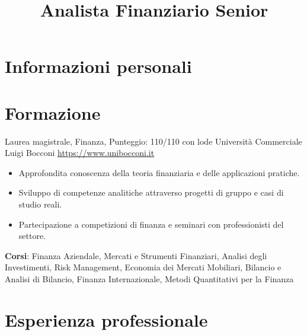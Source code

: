 \documentclass[a4paper, serif, 10pt]{moderncv}
\title{Analista Finanziario Senior}
\begin{document}
\maketitle

\section{Informazioni personali}

\section{Formazione}

        {Laurea magistrale, Finanza, Punteggio: 110/110 con lode}
        {Università Commerciale Luigi Bocconi}
        {\url{https://www.unibocconi.it}}
        {}
        {\begin{itemize}
\item Approfondita conoscenza della teoria finanziaria e delle applicazioni pratiche.
\item Sviluppo di competenze analitiche attraverso progetti di gruppo e casi di studio reali.
\item Partecipazione a competizioni di finanza e seminari con professionisti del settore.
\end{itemize}
\textbf{Corsi}: Finanza Aziendale, Mercati e Strumenti Finanziari, Analisi degli Investimenti, Risk Management, Economia dei Mercati Mobiliari, Bilancio e Analisi di Bilancio, Finanza Internazionale, Metodi Quantitativi per la Finanza}
\section{Esperienza professionale}
\end{document}

